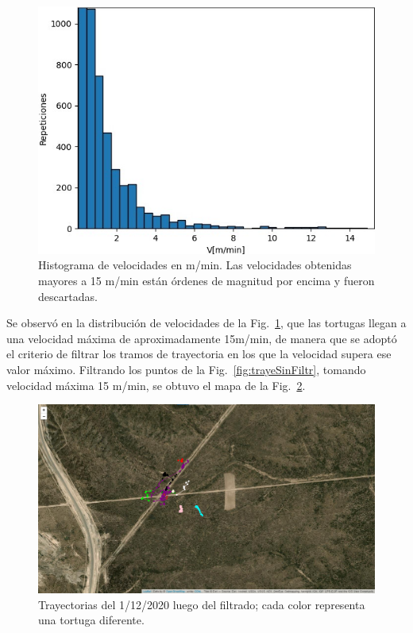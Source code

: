  
\begin{figure}[ht]
\begin{center}
       
   
    \includegraphics[width=\imsize]{Chap2/Velocidades2.jpeg}
    \caption[Distribución de velocidades.]{Histograma de velocidades en m/min. Las  velocidades obtenidas mayores a 15 m/min están órdenes de magnitud por encima y fueron descartadas.}%
    \label{fig:distribuciondeVel}
\end{center}
\end{figure}
Se observó en la distribución de velocidades de la Fig.~\ref{fig:distribuciondeVel}, que las tortugas llegan a una velocidad máxima de aproximadamente 15m/min, de manera que se adoptó el criterio de filtrar los tramos de trayectoria en los que la velocidad supera ese valor máximo. Filtrando los puntos de la Fig.~\ref{fig:trayeSinFiltr}, tomando velocidad máxima 15 m/min, se obtuvo  el mapa de la Fig.~\ref{fig:trayeConFiltr}.
 
 
 
 
\begin{figure}[ht]
    \begin{center}
       
   
    \includegraphics[width=\imsize]{Chap2/Traye1_12_conF.png}
\end{center}
    \caption[Trayectorias un dia de medición, después del filtrado.]{Trayectorias del 1/12/2020 luego del filtrado; cada color representa una tortuga diferente.}
    \label{fig:trayeConFiltr}
\end{figure}
 
